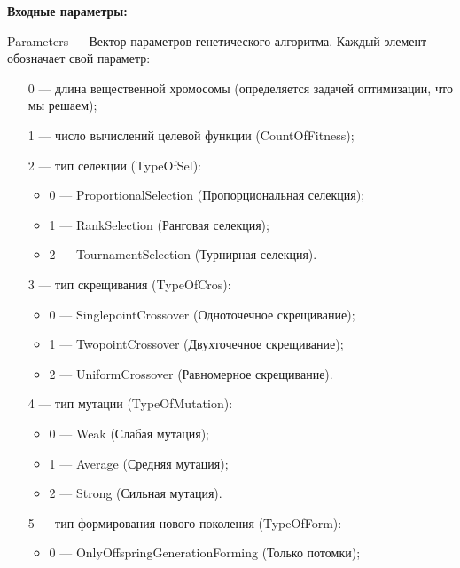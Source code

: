 \textbf{Входные параметры:}
 
Parameters --- Вектор параметров генетического алгоритма. Каждый элемент обозначает свой параметр:
 
 \begin{itemize}
 \item   [0] --- длина вещественной хромосомы (определяется задачей оптимизации, что мы решаем);
  \item   [1] --- число вычислений целевой функции (CountOfFitness);
  \item    [2] --- тип селекции (TypeOfSel):
 \begin{itemize}
       \item 0 --- ProportionalSelection (Пропорциональная селекция);
 
       \item 1 --- RankSelection (Ранговая селекция);
 
       \item 2 --- TournamentSelection (Турнирная селекция).
	    \end{itemize}
 
 \item [3] --- тип скрещивания (TypeOfCros):
  \begin{itemize}
       \item 0 --- SinglepointCrossover (Одноточечное скрещивание);
 
       \item 1 --- TwopointCrossover (Двухточечное скрещивание);
 
       \item 2 --- UniformCrossover (Равномерное скрещивание).
	    \end{itemize}
 
 \item [4] --- тип мутации (TypeOfMutation):
  \begin{itemize}
       \item 0 --- Weak (Слабая мутация);
 
       \item 1 --- Average (Средняя мутация);
 
       \item 2 --- Strong (Сильная мутация).
	    \end{itemize}
 
 \item [5] --- тип формирования нового поколения (TypeOfForm):
  \begin{itemize}
       \item 0 --- OnlyOffspringGenerationForming (Только потомки);
 

\end{itemize}
\end{itemize}
